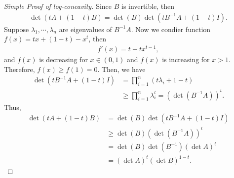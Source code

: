 \documentclass[11pt]{article}
\theoremstyle{definition}
\numberwithin{equation}{subsection}
\begin{document}
\medskip

\begin{proof}[Simple Proof of log-concavity]
Since $B$ is invertible, then
\begin{align*}
    \det(tA + (1-t)B) = \det(B) \det\left(tB^{-1}A + (1-t)I\right).
\end{align*}
Suppose $\lambda_1, \cdots, \lambda_n$ are eigenvalues of $B^{-1}A$. Now we condier function $f(x) = tx + (1-t) - x^t$, then 
\begin{align*}
    f'(x) = t - tx^{t-1},
\end{align*}
and $f(x)$ is decreasing for $x \in (0,1)$ and $f(x)$ is increasing for $x > 1$. Therefore, $f(x) \geq f(1) = 0$. Then, we have
\begin{align*}
    \det\left(tB^{-1}A + (1-t)I\right) & = \prod^n_{i=1} (t \lambda_i + 1 - t) \\
    & \geq \prod^n_{i=1}\lambda_i^t = \left(\det(B^{-1}A)\right)^t.
\end{align*}
Thus, 
\begin{align*}
    \det(tA + (1-t)B) & = \det(B) \det\left(tB^{-1}A + (1-t)I\right)\\
    & \geq \det(B) \left(\det(B^{-1}A)\right)^t \\
    & = \det(B) \det\left(B^{-1}\right) (\det A)^t \\
    & = (\det A)^t (\det B)^{1-t}.
\end{align*}
\end{proof}












\newpage


\end{document}
